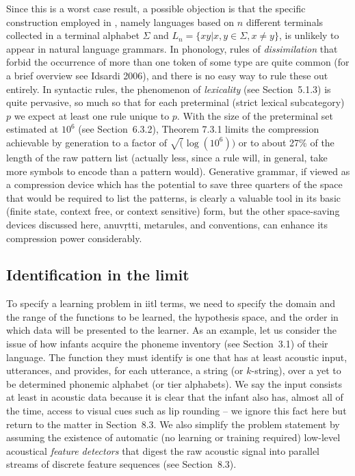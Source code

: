 \smallskip{} Since this is a worst case result, a
possible objection is that the specific construction employed in
, namely languages based on $n$ different terminals
collected in a terminal alphabet $\Sigma$ and $L_n = \{xy | x, y \in \Sigma, x
\neq y \}$, is unlikely to appear in natural language grammars. In phonology,
rules of {\it dissimilation} that forbid the occurrence
of more than one token of some type are quite common (for a brief overview see
Idsardi 2006)\nocite{Idsardi:2006}, and there is no easy way to rule these out
entirely. In syntactic rules, the phenomenon of {\it lexicality} (see
Section~5.1.3) is quite pervasive, so much so that for each preterminal
(strict lexical subcategory) $p$ we expect at least one rule unique to
$p$. With the size of the preterminal set estimated at $10^6$ (see
Section~6.3.2), Theorem 7.3.1 limits the compression achievable by generation
to a factor of $\sqrt(\log(10^6))$ or to about 27\% of the length of the raw
pattern list (actually less, since a rule will, in general, take more symbols
to encode than a pattern would). Generative grammar, if viewed as a
compression device which has the potential to save three quarters of the space
that would be required to list the patterns, is clearly a valuable tool in its
basic (finite state, context free, or context sensitive) form, but the other
space-saving devices discussed here, anuv\d{r}tti, metarules, and conventions,
can enhance its compression power considerably.

\subsection{Identification in the limit}

To specify a learning problem in iitl terms, we need to specify the domain and
the range of the functions to be learned, the hypothesis space, and the order
in which data will be presented to the learner. As an example, let us consider
the issue of how infants acquire the phoneme inventory (see Section~3.1) of
their language. The function they must identify is one that has at least
acoustic input, utterances, and provides, for each utterance, a string (or
$k$-string), over a yet to be determined phonemic alphabet (or tier
alphabets). We say the input consists at least in acoustic data because it is
clear that the infant also has, almost all of the time, access to visual cues
such as lip rounding -- we ignore this fact here but return to the matter in
Section~8.3. We also simplify the problem statement by assuming the existence
of automatic (no learning or training required) low-level acoustical {\it
  feature detectors} that digest the raw acoustic
signal into parallel streams of discrete feature sequences (see Section~8.3).

